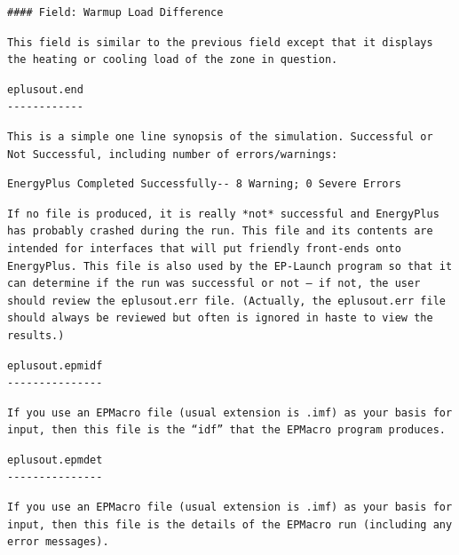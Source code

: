 \begin{lstlisting}
#### Field: Warmup Load Difference
\end{lstlisting}

\begin{lstlisting}
This field is similar to the previous field except that it displays the heating or cooling load of the zone in question.
\end{lstlisting}

\begin{lstlisting}
eplusout.end
------------
\end{lstlisting}

\begin{lstlisting}
This is a simple one line synopsis of the simulation. Successful or Not Successful, including number of errors/warnings:
\end{lstlisting}

\begin{lstlisting}
EnergyPlus Completed Successfully-- 8 Warning; 0 Severe Errors
\end{lstlisting}

\begin{lstlisting}
If no file is produced, it is really *not* successful and EnergyPlus has probably crashed during the run. This file and its contents are intended for interfaces that will put friendly front-ends onto EnergyPlus. This file is also used by the EP-Launch program so that it can determine if the run was successful or not – if not, the user should review the eplusout.err file. (Actually, the eplusout.err file should always be reviewed but often is ignored in haste to view the results.)
\end{lstlisting}

\begin{lstlisting}
eplusout.epmidf
---------------
\end{lstlisting}

\begin{lstlisting}
If you use an EPMacro file (usual extension is .imf) as your basis for input, then this file is the “idf” that the EPMacro program produces.
\end{lstlisting}

\begin{lstlisting}
eplusout.epmdet
---------------
\end{lstlisting}

\begin{lstlisting}
If you use an EPMacro file (usual extension is .imf) as your basis for input, then this file is the details of the EPMacro run (including any error messages).
\end{lstlisting}

